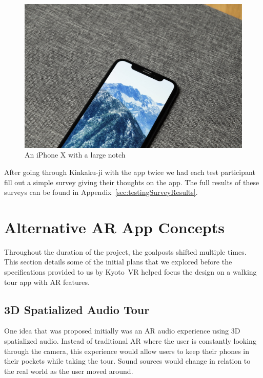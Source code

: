 \documentclass[a4paper, 10pt, american, titlepage]{article}
\begin{document}
\begin{figure}[h]
	\centering
	\includegraphics[width=\textwidth]{iphone-x.jpg}
	\caption[An iPhone X with a large notch]{An iPhone X with a large
		notch~\autocite{yoo2017}}
	\label{fig:iPhoneX}
\end{figure}

After going through Kinkaku-ji with the app twice we had each test participant
fill out a simple survey giving their thoughts on the app. The full results of
these surveys can be found in Appendix~\ref{sec:testingSurveyResults}.

\clearpage

\section{Alternative AR App Concepts}
\label{sec:alternativeArAppConcepts}

Throughout the duration of the project, the goalposts shifted multiple times.
This section details some of the initial plans that we explored before the
specifications provided to us by Kyoto~VR helped focus the design on a walking
tour app with AR features.

\subsection{3D Spatialized Audio Tour}
\label{sec:3dSpatializedAudioTour}

One idea that was proposed initially was an AR audio experience using 3D
spatialized audio. Instead of traditional AR where the user is constantly
looking through the camera, this experience would allow users to keep their
phones in their pockets while taking the tour. Sound sources would change in
relation to the real world as the user moved around.
\end{document}
